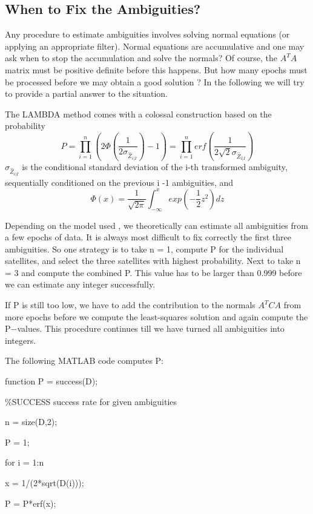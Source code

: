 \subsection{When to Fix the Ambiguities?}

Any procedure to estimate ambiguities involves solving normal equations (or applying an
appropriate filter). Normal equations are accumulative and one may ask when to stop the
accumulation and solve the normals? Of course, the $A^{T}A$ matrix must be positive definite before this happens. But how many epochs must be processed before we may obtain a good solution ? In the following we will try to provide a partial answer to the situation.

The LAMBDA method comes with a colossal construction based on the probability
\begin{equation}
P=\prod_{i=1}^{n}(2\Phi(\frac{1}{2\sigma_{\hat{Z}_{i|I}}})-1)=\prod_{i=1}^{n}erf(\frac{1}{2\sqrt{2}\sigma_{\hat{Z}_{i|I}}})
\end{equation}
$\sigma_{\hat{Z}_{i|I}}$ is the conditional standard deviation of the i-th transformed ambiguity, sequentially conditioned on the previous i -1 ambiguities, and
$$
\Phi(x)=\frac{1}{\sqrt{2\pi}}\int_{-\infty}^{x}exp(-\frac{1}{2}z^{2})dz
$$

Depending on the model used , we theoretically can estimate all ambiguities from a few epochs of data. It is always most difficult to fix correctly the first three ambiguities. So one strategy is to take n = 1, compute P for the individual satellites, and select the three satellites with highest probability. Next to take n = 3 and compute the combined P. This value has to be larger than 0.999 before we can estimate any integer successfully.

If P is still too low, we have to add the contribution to the normals $A^{T}CA$ from more epochs before we compute the least-squares solution and again compute the P$-$values. This procedure continues till we have turned all ambiguities into integers.

The following MATLAB code computes P:

function P = success(D);

\%SUCCESS success rate for given ambiguities

n = size(D,2);

P = 1;

for i = 1:n

x = 1/(2*sqrt(D(i)));

P = P*erf(x);

